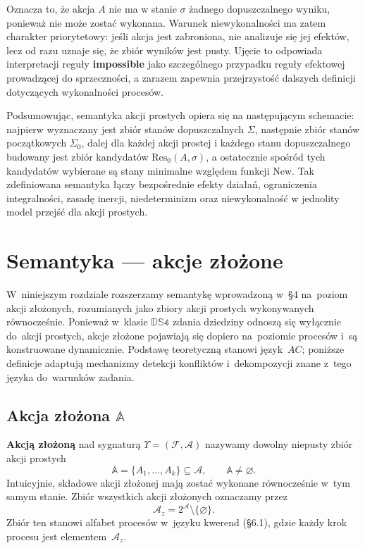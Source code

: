 \documentclass[11pt,a4paper]{article}
\newif\ifshowbib
\newcommand{\bibonly}[1]{\ifshowbib#1\fi}
\renewcommand{\cite}[2][]{\unskip}%
\theoremstyle{definition}
\begin{document}
Oznacza to, że akcja $A$ nie ma w stanie $\sigma$ żadnego dopuszczalnego wyniku, ponieważ nie może zostać wykonana. Warunek niewykonalności ma zatem charakter priorytetowy: jeśli akcja jest zabroniona, nie analizuje się jej efektów, lecz od razu uznaje się, że zbiór wyników jest pusty. Ujęcie to odpowiada interpretacji reguły \textbf{impossible} jako szczególnego przypadku reguły efektowej prowadzącej do sprzeczności, a zarazem zapewnia przejrzystość dalszych definicji dotyczących wykonalności procesów.

Podsumowując, semantyka akcji prostych opiera się na następującym schemacie: najpierw wyznaczany jest zbiór stanów dopuszczalnych $\Sigma$, następnie zbiór stanów początkowych $\Sigma_0$, dalej dla każdej akcji prostej i każdego stanu dopuszczalnego budowany jest zbiór kandydatów $\mathrm{Res}_0(A,\sigma)$, a ostatecznie spośród tych kandydatów wybierane są stany minimalne względem funkcji $\mathrm{New}$. Tak zdefiniowana semantyka łączy bezpośrednie efekty działań, ograniczenia integralności, zasadę inercji, niedeterminizm oraz niewykonalność w jednolity model przejść dla akcji prostych.

\section{Semantyka --- akcje złożone}

W~niniejszym rozdziale rozszerzamy semantykę wprowadzoną w~\S4 na~poziom
akcji złożonych, rozumianych jako zbiory akcji prostych wykonywanych
równocześnie. Ponieważ w~klasie $\mathbb{DS4}$ zdania dziedziny
odnoszą się wyłącznie do~akcji prostych, akcje złożone pojawiają się
dopiero na~poziomie procesów i~są konstruowane dynamicznie. Podstawę
teoretyczną stanowi język~$AC$\bibonly{~\cite{rw05}}; poniższe definicje
adaptują mechanizmy detekcji konfliktów i~dekompozycji znane z~tego języka
do~warunków zadania.

\subsection{Akcja złożona \texorpdfstring{$\mathbb{A}$}{A}}
\label{sec:akcja-zlozona}

\textbf{Akcją złożoną} nad sygnaturą $\Upsilon=(\mathcal{F},\mathcal{A})$
nazywamy dowolny niepusty zbiór akcji prostych
\[
  \mathbb{A} = \{A_1, \ldots, A_k\} \subseteq \mathcal{A},
  \qquad \mathbb{A} \neq \varnothing.
\]
Intuicyjnie, składowe akcji złożonej mają zostać wykonane równocześnie
w~tym samym stanie. Zbiór wszystkich akcji złożonych oznaczamy przez
\[
  \mathcal{A}_z = 2^{\mathcal{A}} \setminus \{\varnothing\}.
\]
Zbiór ten stanowi alfabet procesów w~języku kwerend (\S6.1),
gdzie każdy krok procesu jest elementem~$\mathcal{A}_z$.
\end{document}
